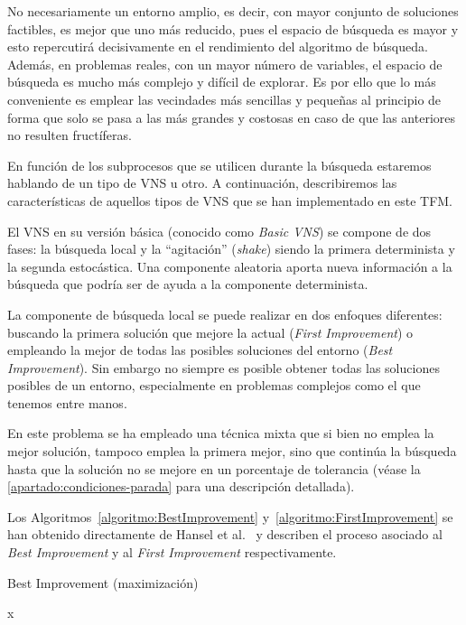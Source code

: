No necesariamente un entorno amplio, es decir, con mayor conjunto de soluciones factibles, es mejor que uno más reducido, pues el espacio de búsqueda es mayor y esto repercutirá decisivamente en el rendimiento del algoritmo de búsqueda. Además, en problemas reales, con un mayor número de variables, el espacio de búsqueda es mucho más complejo y difícil de explorar. Es por ello que lo más conveniente es emplear las vecindades más sencillas y pequeñas al principio de forma que solo se pasa a las más grandes y costosas en caso de que las anteriores no resulten fructíferas.

En función de los subprocesos que se utilicen durante la búsqueda estaremos hablando de un tipo de VNS u otro. A continuación, describiremos las características de aquellos tipos de VNS que se han implementado en este TFM\@.

El VNS en su versión básica (conocido como \textit{Basic VNS}) se compone de dos fases: la búsqueda local y la ``agitación'' (\textit{shake}) siendo la primera determinista y la segunda estocástica. Una componente aleatoria aporta nueva información a la búsqueda que podría ser de ayuda a la componente determinista.

La componente de búsqueda local se puede realizar en dos enfoques diferentes: buscando la primera solución que mejore la actual (\textit{First Improvement}) o empleando la mejor de todas las posibles soluciones del entorno (\textit{Best Improvement}). Sin embargo no siempre es posible obtener todas las soluciones posibles de un entorno, especialmente en problemas complejos como el que tenemos entre manos. 

En este problema se ha empleado una técnica mixta que si bien no emplea la mejor solución, tampoco emplea la primera mejor, sino que continúa la búsqueda hasta que la solución no se mejore en un porcentaje de tolerancia (véase la \autoref{apartado:condiciones-parada} para una descripción detallada).

Los Algoritmos~\ref{algoritmo:BestImprovement} y~\ref{algoritmo:FirstImprovement} se han obtenido directamente de Hansel et al.~\cite{vns} y describen el proceso asociado al \textit{Best Improvement} y al \textit{First Improvement} respectivamente.

\begin{algorithm}[htbp]
    \caption{Best Improvement (maximización)}
    \label{algoritmo:BestImprovement}

    \DontPrintSemicolon
    \medskip

    \Return x \;

\end{algorithm}

